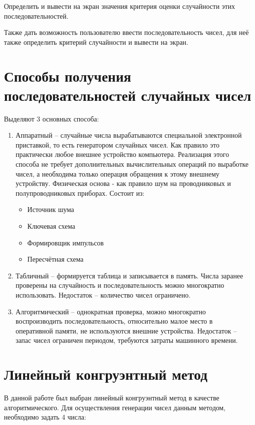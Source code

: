 \documentclass[12pt,a4paper,oneside]{report}
\begin{document}
	Определить и вывести на экран значения критерия оценки случайности этих последовательностей.
	
	Также дать возможность пользователю ввести последовательность чисел, для неё также определить критерий случайности и вывести на экран.
	
	
	\section*{Способы получения последовательностей случайных чисел}
	\quad Выделяют 3 основных способа:
	\begin{enumerate}
		\item Аппаратный -- случайные числа вырабатываются специальной электронной приставкой, то есть генератором случайных чисел. Как правило это практически любое внешнее устройство компьютера. Реализация этого способа не требует дополнительных вычислительных операций по выработке чисел, а необходима только операция обращения к этому внешнему устройству. Физическая основа - как правило шум на проводниковых и полупроводниковых приборах. Состоит из:
		\begin{itemize}
			\item Источник шума
			\item Ключевая схема
			\item Формировщик импульсов
			\item Пересчётная схема
		\end{itemize}
		
		\item Табличный -- формируется таблица и записывается в память. Числа заранее проверены на случайность и последовательность можно многократно использовать. Недостаток -- количество чисел ограничено.
		
		\item Алгоритмический -- однократная проверка, можно многократно воспроизводить последовательность, относительно малое место в оперативной памяти, не используются внешние устройства. Недостаток -- запас чисел ограничен периодом, требуются затраты машинного времени.
	\end{enumerate}
	
	\section*{Линейный конгруэнтный метод}
	\quad В данной работе был выбран линейный конгруэнтный метод в качестве алгоритмического.
	Для осуществления генерации чисел данным методом, необходимо задать 4 числа:
	
\end{document}
